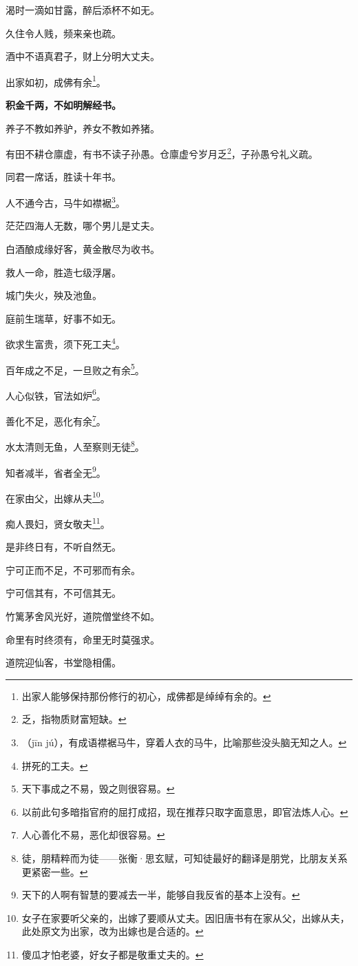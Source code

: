 \documentclass[12pt,oneside]{book}
\begin{document}
渴时一滴如甘露，醉后添杯不如无。

久住令人贱，频来亲也疏。

酒中不语真君子，财上分明大丈夫。

出家如初，成佛有余\footnote{出家人能够保持那份修行的初心，成佛都是绰绰有余的。}。

\textbf{积金千两，不如明解经书。}

养子不教如养驴，养女不教如养猪。

有田不耕仓廪虚，有书不读子孙愚。仓廪虚兮岁月乏\footnote{乏，指物质财富短缺。}，子孙愚兮礼义疏。

同君一席话，胜读十年书。

人不通今古，马牛如襟裾\footnote{（jīn jú），有成语襟裾马牛，穿着人衣的马牛，比喻那些没头脑无知之人。}。

茫茫四海人无数，哪个男儿是丈夫。

白酒酿成缘好客，黄金散尽为收书。

救人一命，胜造七级浮屠。

城门失火，殃及池鱼。

庭前生瑞草，好事不如无。

欲求生富贵，须下死工夫\footnote{拼死的工夫。}。

百年成之不足，一旦败之有余\footnote{天下事成之不易，毁之则很容易。}。

人心似铁，官法如炉\footnote{以前此句多暗指官府的屈打成招，现在推荐只取字面意思，即官法炼人心。}。

善化不足，恶化有余\footnote{人心善化不易，恶化却很容易。}。

水太清则无鱼，人至察则无徒\footnote{徒，朋精粹而为徒——张衡·思玄赋，可知徒最好的翻译是朋党，比朋友关系更紧密一些。}。

知者减半，省者全无\footnote{天下的人啊有智慧的要减去一半，能够自我反省的基本上没有。}。

在家由父，出嫁从夫\footnote{女子在家要听父亲的，出嫁了要顺从丈夫。因旧唐书有在家从父，出嫁从夫，此处原文为出家，改为出嫁也是合适的。}。

痴人畏妇，贤女敬夫\footnote{傻瓜才怕老婆，好女子都是敬重丈夫的。}。

是非终日有，不听自然无。

宁可正而不足，不可邪而有余。

宁可信其有，不可信其无。

竹篱茅舍风光好，道院僧堂终不如。

命里有时终须有，命里无时莫强求。

道院迎仙客，书堂隐相儒。
\end{document}
